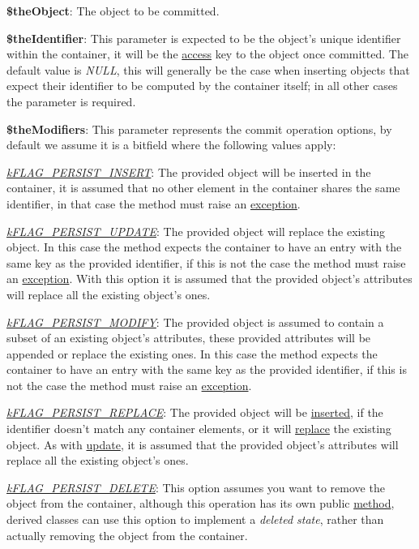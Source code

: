 \begin{DoxyItemize}
\item {\bfseries \$the\-Object}\-: The object to be committed. 
\item {\bfseries \$the\-Identifier}\-: This parameter is expected to be the object's unique identifier within the container, it will be the \hyperlink{class_c_container_a48db96aa6bbf15d0bfc15725616b7154}{access} key to the object once committed. The default value is {\itshape N\-U\-L\-L\/}, this will generally be the case when inserting objects that expect their identifier to be computed by the container itself; in all other cases the parameter is required. 
\item {\bfseries \$the\-Modifiers}\-: This parameter represents the commit operation options, by default we assume it is a bitfield where the following values apply\-: 
\begin{DoxyItemize}
\item {\itshape \hyperlink{}{k\-F\-L\-A\-G\-\_\-\-P\-E\-R\-S\-I\-S\-T\-\_\-\-I\-N\-S\-E\-R\-T}\/}\-: The provided object will be inserted in the container, it is assumed that no other element in the container shares the same identifier, in that case the method must raise an \hyperlink{}{exception}. 
\item {\itshape \hyperlink{}{k\-F\-L\-A\-G\-\_\-\-P\-E\-R\-S\-I\-S\-T\-\_\-\-U\-P\-D\-A\-T\-E}\/}\-: The provided object will replace the existing object. In this case the method expects the container to have an entry with the same key as the provided identifier, if this is not the case the method must raise an \hyperlink{}{exception}. With this option it is assumed that the provided object's attributes will replace all the existing object's ones. 
\item {\itshape \hyperlink{}{k\-F\-L\-A\-G\-\_\-\-P\-E\-R\-S\-I\-S\-T\-\_\-\-M\-O\-D\-I\-F\-Y}\/}\-: The provided object is assumed to contain a subset of an existing object's attributes, these provided attributes will be appended or replace the existing ones. In this case the method expects the container to have an entry with the same key as the provided identifier, if this is not the case the method must raise an \hyperlink{}{exception}. 
\item {\itshape \hyperlink{}{k\-F\-L\-A\-G\-\_\-\-P\-E\-R\-S\-I\-S\-T\-\_\-\-R\-E\-P\-L\-A\-C\-E}\/}\-: The provided object will be \hyperlink{}{inserted}, if the identifier doesn't match any container elements, or it will \hyperlink{}{replace} the existing object. As with \hyperlink{}{update}, it is assumed that the provided object's attributes will replace all the existing object's ones. 
\item {\itshape \hyperlink{}{k\-F\-L\-A\-G\-\_\-\-P\-E\-R\-S\-I\-S\-T\-\_\-\-D\-E\-L\-E\-T\-E}\/}\-: This option assumes you want to remove the object from the container, although this operation has its own public \hyperlink{class_c_container_aa91ec2f4624a2ebfb74668f274139329}{method}, derived classes can use this option to implement a {\itshape deleted state\/}, rather than actually removing the object from the container. 
\end{DoxyItemize}
\end{DoxyItemize}

